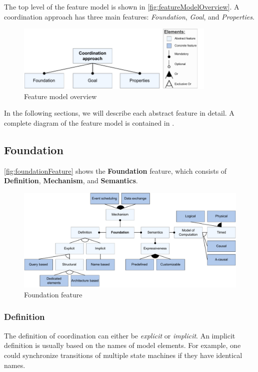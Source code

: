 \documentclass[runningheads]{llncs}
\begin{document}
The top level of the feature model is shown in \autoref{fig:featureModelOverview}.
A coordination approach has three main features: \textit{Foundation}, \textit{Goal}, and \textit{Properties}.

\begin{figure}[ht]
	\centering
	\includegraphics[width=0.85\textwidth]{images/root}
	\caption{Feature model overview}
	\label{fig:featureModelOverview}
\end{figure}

In the following sections, we will describe each abstract feature in detail.
A complete diagram of the feature model is contained in \cite{timkrauterArtifactsCoordination2024}.

\subsection{Foundation}

\autoref{fig:foundationFeature} shows the \textbf {Foundation} feature, which consists of \textbf{Definition}, \textbf{Mechanism}, and \textbf{Semantics}.

\begin{figure}[ht]
	\centering
	\includegraphics[width=1\textwidth]{images/coordination_feature}
	\caption{Foundation feature}
	\label{fig:foundationFeature}
\end{figure}

\subsubsection{Definition} The definition of coordination can either be \textit{explicit} or \textit{implicit}.
An implicit definition is usually based on the names of model elements.
For example, one could synchronize transitions of multiple state machines if they have identical names.
\end{document}
